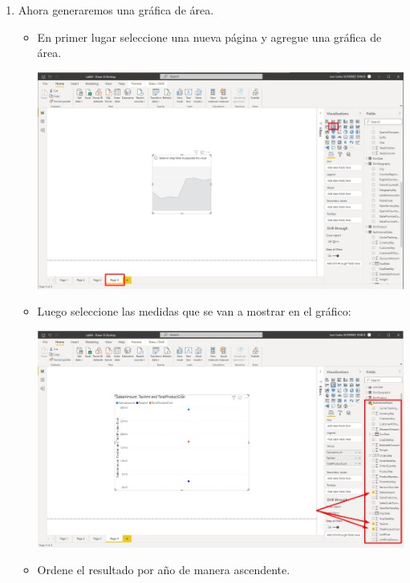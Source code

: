 \documentclass{article}
\begin{document}
\begin{enumerate}[\tab 1.]
\begin{itemize}
        \end{itemize}
        \newpage
        \item Ahora generaremos una gráfica de área.
        \begin{itemize}
            \item En primer lugar seleccione una nueva página y agregue una gráfica de área.
            \begin{center}
                \includegraphics[width=13cm]{./images/11.1.png}
            \end{center}
            \newpage
            \item Luego seleccione las medidas que se van a mostrar en el gráfico:
            \begin{center}
                \includegraphics[width=13cm]{./images/11.2.png}
            \end{center}
            \item Ordene el resultado por año de manera ascendente.
            \begin{center}

\end{center}
\end{itemize}
\end{enumerate}
\end{document}
